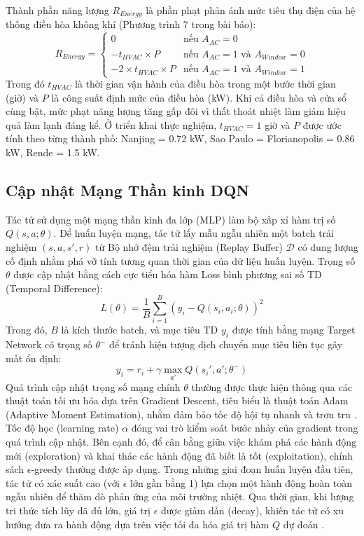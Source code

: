 \documentclass[12pt, a4paper]{report}
\begin{document}
Thành phần năng lượng $R_{Energy}$ là phần phạt phản ánh mức tiêu thụ điện của hệ thống điều hòa không khí (Phương trình 7 trong bài báo):
\begin{equation}
R_{Energy} =
\begin{cases}
0 & \text{nếu } A_{AC} = 0 \\[4pt]
-t_{HVAC} \times P & \text{nếu } A_{AC} = 1 \text{ và } A_{Window} = 0 \\[4pt]
-2 \times t_{HVAC} \times P & \text{nếu } A_{AC} = 1 \text{ và } A_{Window} = 1
\end{cases}
\end{equation}
Trong đó $t_{HVAC}$ là thời gian vận hành của điều hòa trong một bước thời gian (giờ) và $P$ là công suất định mức của điều hòa (kW). Khi cả điều hòa và cửa sổ cùng bật, mức phạt năng lượng tăng gấp đôi vì thất thoát nhiệt làm giảm hiệu quả làm lạnh đáng kể. Ở triển khai thực nghiệm, $t_{HVAC} = 1$ giờ và $P$ được ước tính theo từng thành phố: Nanjing = 0.72 kW, Sao Paulo = Florianopolis = 0.86 kW, Rende = 1.5 kW.

\subsection{Cập nhật Mạng Thần kinh DQN}
Tác tử sử dụng một mạng thần kinh đa lớp (MLP) làm bộ xấp xỉ hàm trị số $Q(s, a; \theta)$. Để huấn luyện mạng, tác tử lấy mẫu ngẫu nhiên một batch trải nghiệm $(s, a, s', r)$ từ Bộ nhớ đệm trải nghiệm (Replay Buffer) $\mathcal{D}$ có dung lượng cố định nhằm phá vỡ tính tương quan thời gian của dữ liệu huấn luyện. Trọng số $\theta$ được cập nhật bằng cách cực tiểu hóa hàm Loss bình phương sai số TD (Temporal Difference):
\begin{equation}
L(\theta) = \frac{1}{B} \sum_{i=1}^{B} \left( y_i - Q(s_i, a_i; \theta) \right)^2
\end{equation}
Trong đó, $B$ là kích thước batch, và mục tiêu TD $y_i$ được tính bằng mạng Target Network có trọng số $\theta^-$ để tránh hiện tượng dịch chuyển mục tiêu liên tục gây mất ổn định:
\begin{equation}
y_i = r_i + \gamma \max_{a'} Q(s_i', a'; \theta^-)
\end{equation}
Quá trình cập nhật trọng số mạng chính $\theta$ thường được thực hiện thông qua các thuật toán tối ưu hóa dựa trên Gradient Descent, tiêu biểu là thuật toán Adam (Adaptive Moment Estimation), nhằm đảm bảo tốc độ hội tụ nhanh và trơn tru \cite{adam}. Tốc độ học (learning rate) $\alpha$ đóng vai trò kiểm soát bước nhảy của gradient trong quá trình cập nhật. Bên cạnh đó, để cân bằng giữa việc khám phá các hành động mới (exploration) và khai thác các hành động đã biết là tốt (exploitation), chính sách $\epsilon$-greedy thường được áp dụng. Trong những giai đoạn huấn luyện đầu tiên, tác tử có xác suất cao (với $\epsilon$ lớn gần bằng 1) lựa chọn một hành động hoàn toàn ngẫu nhiên để thăm dò phản ứng của môi trường nhiệt. Qua thời gian, khi lượng tri thức tích lũy đã đủ lớn, giá trị $\epsilon$ được giảm dần (decay), khiến tác tử có xu hướng đưa ra hành động dựa trên việc tối đa hóa giá trị hàm $Q$ dự đoán \cite{dqn}. 
\end{document}
